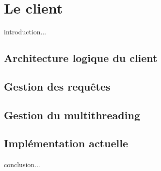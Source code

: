 
\section*{Le client}

	\paragraph{}introduction...
	
	\subsection*{Architecture logique du client}
	
	\subsection*{Gestion des requ\^etes}
	
	\subsection*{Gestion du multithreading}

	\subsection*{Implémentation actuelle}
	
	\paragraph{}conclusion...
